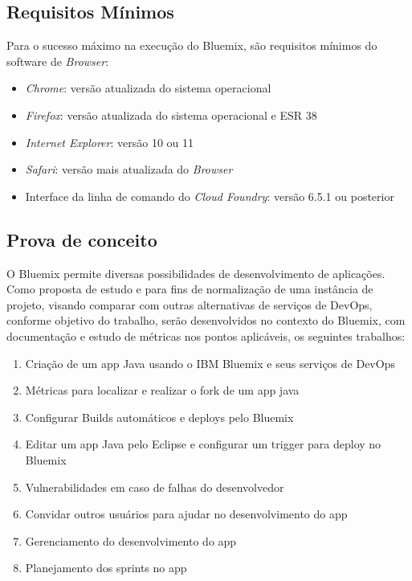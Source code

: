 \subsection{Requisitos Mínimos}

Para o sucesso máximo na execução do Bluemix, são requisitos mínimos do software de \textit{Browser}:
\begin{itemize}
    \item	\textit{Chrome}: versão atualizada do sistema operacional
    \item	\textit{Firefox}: versão atualizada do sistema operacional e ESR 38
    \item	\textit{Internet Explorer}: versão 10 ou 11
    \item	\textit{Safari}: versão mais atualizada do \textit{Browser}
    \item	Interface da linha de comando do \textit{Cloud Foundry}: versão 6.5.1 ou posterior
\end{itemize}

\subsection{Prova de conceito}

O Bluemix permite diversas possibilidades de desenvolvimento de aplicações. Como proposta de estudo e para fins de normalização de uma instância de projeto, visando comparar com outras alternativas de serviços de DevOps, conforme objetivo do trabalho, serão desenvolvidos no contexto do Bluemix, com documentação e estudo de métricas nos pontos aplicáveis, os seguintes trabalhos:
\begin{enumerate}
    \item Criação de um app Java usando o IBM Bluemix e seus serviços de DevOps
    \item Métricas para localizar e realizar o fork de um app java
    \item Configurar Builds automáticos e deploys pelo Bluemix
    \item Editar um app Java pelo Eclipse e configurar um trigger para deploy no Bluemix
    \item Vulnerabilidades em caso de falhas do desenvolvedor
    \item Convidar outros usuários para ajudar no desenvolvimento do app
    \item Gerenciamento do desenvolvimento do app
    \item Planejamento dos sprints no app
\end{enumerate}

